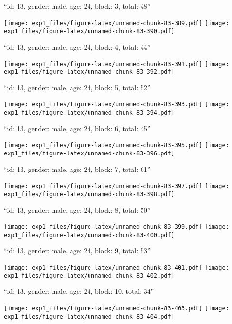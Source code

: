 \documentclass[11pt,,]{article}
\begin{document}
\newpage
[1] 

``id: 13, gender: male, age: 24, block: 3, total: 48''

\texttt{[image: exp1\_files/figure-latex/unnamed-chunk-83-389.pdf]}
\texttt{[image: exp1\_files/figure-latex/unnamed-chunk-83-390.pdf]}

\newpage
[1] 

``id: 13, gender: male, age: 24, block: 4, total: 44''

\texttt{[image: exp1\_files/figure-latex/unnamed-chunk-83-391.pdf]}
\texttt{[image: exp1\_files/figure-latex/unnamed-chunk-83-392.pdf]}

\newpage
[1] 

``id: 13, gender: male, age: 24, block: 5, total: 52''

\texttt{[image: exp1\_files/figure-latex/unnamed-chunk-83-393.pdf]}
\texttt{[image: exp1\_files/figure-latex/unnamed-chunk-83-394.pdf]}

\newpage
[1] 

``id: 13, gender: male, age: 24, block: 6, total: 45''

\texttt{[image: exp1\_files/figure-latex/unnamed-chunk-83-395.pdf]}
\texttt{[image: exp1\_files/figure-latex/unnamed-chunk-83-396.pdf]}

\newpage
[1] 

``id: 13, gender: male, age: 24, block: 7, total: 61''

\texttt{[image: exp1\_files/figure-latex/unnamed-chunk-83-397.pdf]}
\texttt{[image: exp1\_files/figure-latex/unnamed-chunk-83-398.pdf]}

\newpage
[1] 

``id: 13, gender: male, age: 24, block: 8, total: 50''

\texttt{[image: exp1\_files/figure-latex/unnamed-chunk-83-399.pdf]}
\texttt{[image: exp1\_files/figure-latex/unnamed-chunk-83-400.pdf]}

\newpage
[1] 

``id: 13, gender: male, age: 24, block: 9, total: 53''

\texttt{[image: exp1\_files/figure-latex/unnamed-chunk-83-401.pdf]}
\texttt{[image: exp1\_files/figure-latex/unnamed-chunk-83-402.pdf]}

\newpage
[1] 

``id: 13, gender: male, age: 24, block: 10, total: 34''

\texttt{[image: exp1\_files/figure-latex/unnamed-chunk-83-403.pdf]}
\texttt{[image: exp1\_files/figure-latex/unnamed-chunk-83-404.pdf]}
\end{document}
